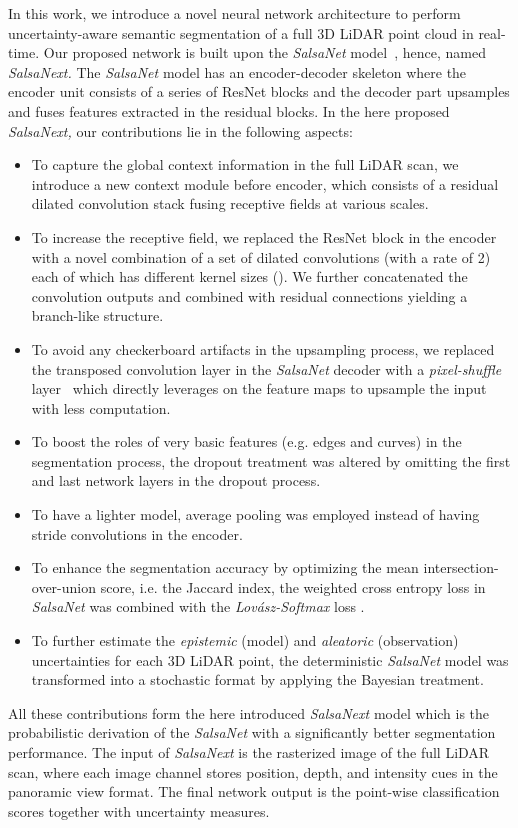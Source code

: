 \documentclass[letterpaper, 10 pt, conference]{ieeeconf}
\makeatletter
\newcommand{\snx}[1]{\textit{SalsaNext }{#1}}
\newcommand{\snxk}[1]{\textit{SalsaNext, }{#1}}
\newcommand{\snxp}[1]{\textit{SalsaNext. }{#1}}
\newcommand{\sn}[1]{\textit{SalsaNet }{#1}}
\newcommand{\ls}[1]{\textit{Lov\'{a}sz-Softmax }{#1}}
\def\eg{e.g.\@\xspace}
\def\ie{i.e.\@\xspace}
\makeatother
\begin{document}
In this work, we introduce a novel neural network architecture to perform uncertainty-aware semantic  segmentation of a full 3D LiDAR point cloud in real-time.
Our proposed network is built upon the \sn model~\cite{salsanet2020}, hence, named   \snxp 
The \sn model has an encoder-decoder skeleton where the encoder unit consists of a series of ResNet blocks and the decoder part upsamples and fuses features extracted in the residual blocks. 
In the here proposed \snxk our contributions lie in the following aspects:
\begin{itemize}
\item To capture the global context information in the full  LiDAR scan,  we introduce a new context module before encoder, which consists of a residual dilated convolution stack fusing receptive fields at various scales. 
\item To increase the receptive field, we replaced the ResNet block in the encoder with a novel combination of a  set of dilated convolutions (with a rate of 2) each of which has different kernel sizes (). We further concatenated the convolution outputs and combined with   residual connections yielding a branch-like structure.
\item To avoid any checkerboard artifacts in the upsampling process, we replaced the transposed convolution layer in the \sn decoder with a \textit{pixel-shuffle} layer~\cite{pixelshuffle} which directly leverages on the feature maps to upsample the input with less computation.
\item To boost the roles of very basic  features (\eg edges and curves) in the segmentation process, the dropout treatment was altered by omitting the first and last network layers in the dropout process. 
\item To have a lighter model, average pooling was employed instead of having stride convolutions in the encoder.
\item To enhance the segmentation accuracy by optimizing the mean intersection-over-union score, \ie the Jaccard
index, the weighted cross entropy loss in \sn was combined with the \ls loss \cite{berman2018lovasz}.
\item To further estimate the \textit{epistemic} (model) and  \textit{aleatoric} (observation) uncertainties for each 3D LiDAR point, the deterministic \sn model was transformed into a stochastic  format by applying the Bayesian treatment.
\end{itemize}  

All these contributions form the here introduced \snx model which is the probabilistic derivation of the \sn with a significantly better segmentation performance. 
The input of \snx is the rasterized image of the full LiDAR scan, where each image channel stores position, depth, and intensity cues in the panoramic view format. The final network output is the point-wise classification scores together with uncertainty measures.
\end{document}
